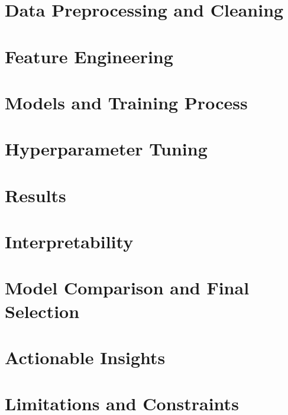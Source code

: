 \documentclass[12pt,a4paper]{article}
\begin{document}
\section{Data Preprocessing and Cleaning}



\section{Feature Engineering}



\section{Models and Training Process}



\section{Hyperparameter Tuning}



\section{Results}



\section{Interpretability}



\section{Model Comparison and Final Selection}



\section{Actionable Insights}



\section{Limitations and Constraints}



\clearpage



\clearpage
\appendix


\end{document}
